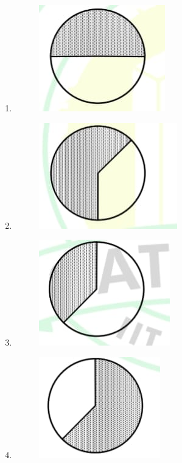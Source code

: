 \documentclass[journal,12pt,onecolumn]{article}
\theoremstyle{remark}
\begin{document}
\begin{enumerate}
\hfill{}
\begin{enumerate}
    \item \begin{figure}[H]
    \centering
    \includegraphics[width=0.4\columnwidth]{figs/1q-5a.jpg}
    \caption{}
    \label{fig:q5}
\end{figure}
\item \begin{figure}[H]
    \centering
    \includegraphics[width=0.4\columnwidth]{figs/1q-5b.jpg}
    \caption{}
    \label{fig:q5}
\end{figure}
\item \begin{figure}[H]
    \centering
    \includegraphics[width=0.4\columnwidth]{figs/1q-5c.jpg}
    \caption{}
    \label{fig:q5}
\end{figure}
\item \begin{figure}[H]
    \centering
    \includegraphics[width=0.4\columnwidth]{figs/1q-5d.jpg}
    \caption{}
    \label{fig:q5}
\end{figure}
\end{enumerate}


\end{enumerate}
\end{document}
